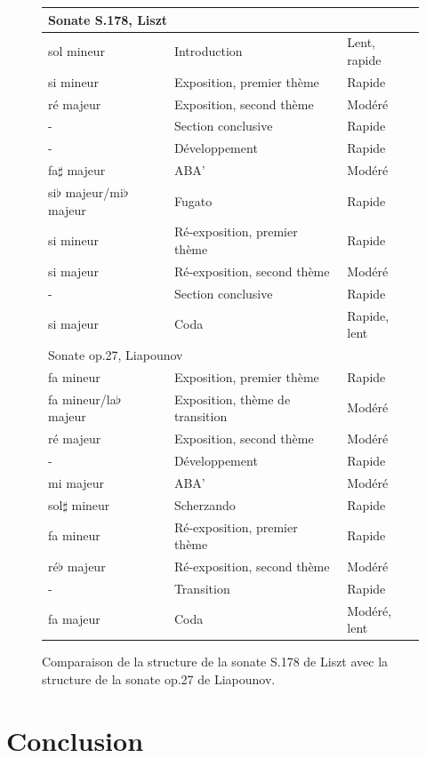 \begin{figure}[!ht]
  \begin{bigcenter}
    \scalebox{0.925} {
\begin{tabular}{|l|l|l|}
 \hline
\multicolumn{3}{|l|}{Sonate S.178, Liszt}\\
 \hline
sol mineur & Introduction & Lent, rapide\\
si mineur & Exposition, premier thème & Rapide\\
ré majeur & Exposition, second thème & Modéré\\
- & Section conclusive & Rapide\\
- & Développement & Rapide\\
fa$\sharp$ majeur & ABA' & Modéré\\
si$\flat$ majeur/mi$\flat$ majeur & Fugato & Rapide\\
si mineur & Ré-exposition, premier thème & Rapide\\
si majeur & Ré-exposition, second thème & Modéré\\
- & Section conclusive & Rapide\\
si majeur & Coda & Rapide, lent\\
 \hline
 \hline
\multicolumn{3}{|l|}{Sonate op.27, Liapounov}\\
 \hline
fa mineur & Exposition, premier thème & Rapide\\
fa mineur/la$\flat$ majeur & Exposition, thème de transition & Modéré\\
ré majeur & Exposition, second thème & Modéré \\
- & Développement & Rapide\\
mi majeur & ABA' & Modéré\\
sol$\sharp$ mineur & Scherzando & Rapide\\
fa mineur & Ré-exposition, premier thème & Rapide\\
ré$\flat$ majeur & Ré-exposition, second thème & Modéré\\
- & Transition & Rapide\\
fa majeur & Coda & Modéré, lent\\
 \hline
\end{tabular}
    }
  \end{bigcenter}
  \caption{\label{sonate-liapounov-list2} Comparaison de la structure de la sonate S.178 de Liszt avec la structure de la sonate op.27 de Liapounov.}
\end{figure}

\section{Conclusion}

